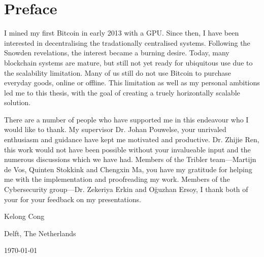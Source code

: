 \chapter*{Preface}
I mined my first Bitcoin in early 2013 with a GPU.
Since then, I have been interested in decentralising the tradationally centralised systems.
Following the Snowden revelations, the interest became a burning desire.
Today, many blockchain systems are mature, but still not yet ready for ubiquitous use due to the scalability limitation.
Many of us still do not use Bitcoin to purchase everyday goods, online or offline.
This limitation as well as my personal ambitions led me to this thesis,
with the goal of creating a truely horizontally scalable solution.

\vspace{1\baselineskip}

\noindent
There are a number of people who have supported me in this endeavour who I would like to thank.
My supervisor Dr. Johan Pouwelse, your unrivaled enthusiasm and guidance have kept me motivated and productive.
Dr. Zhijie Ren, this work would not have been possible without your invalueable input and the numerous discussions which we have had.
Members of the Tribler team---Martijn de Vos, Quinten Stokkink and Chengxin Ma,
you have my gratitude for helping me with the implementation and proofreading my work.
Members of the Cybersecurity group---Dr. Zekeriya Erkin and O\u{g}uzhan Ersoy,
I thank both of your for your feedback on my presentations.

\vspace{1\baselineskip}

\noindent
Kelong Cong

\vspace{1\baselineskip}

\noindent
Delft, The Netherlands

\noindent
\today
